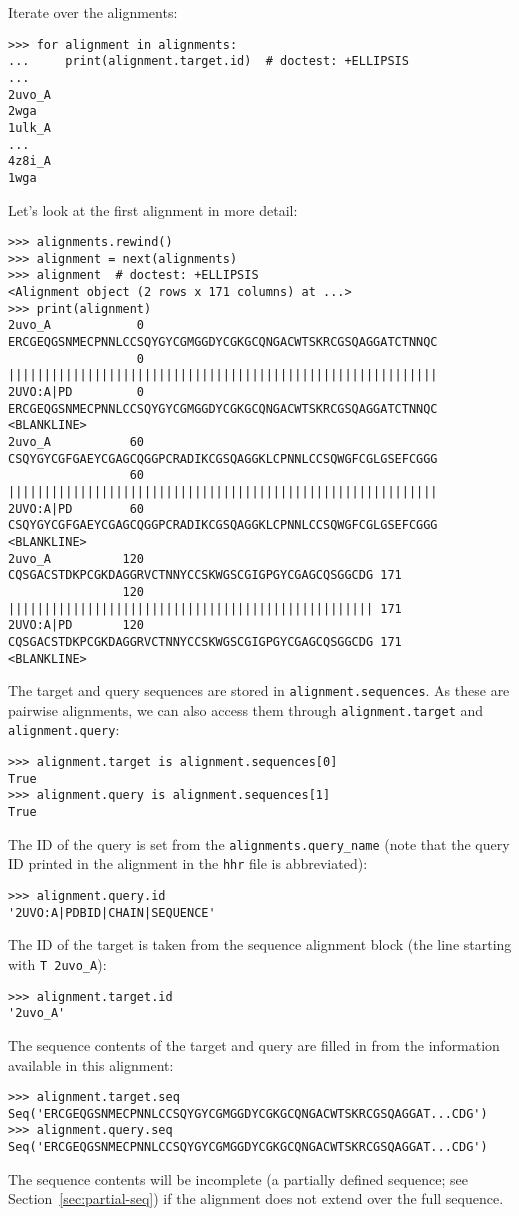 Iterate over the alignments:
\begin{verbatim}
>>> for alignment in alignments:
...     print(alignment.target.id)  # doctest: +ELLIPSIS
...
2uvo_A
2wga
1ulk_A
...
4z8i_A
1wga
\end{verbatim}
Let's look at the first alignment in more detail:
\begin{verbatim}
>>> alignments.rewind()
>>> alignment = next(alignments)
>>> alignment  # doctest: +ELLIPSIS
<Alignment object (2 rows x 171 columns) at ...>
>>> print(alignment)
2uvo_A            0 ERCGEQGSNMECPNNLCCSQYGYCGMGGDYCGKGCQNGACWTSKRCGSQAGGATCTNNQC
                  0 ||||||||||||||||||||||||||||||||||||||||||||||||||||||||||||
2UVO:A|PD         0 ERCGEQGSNMECPNNLCCSQYGYCGMGGDYCGKGCQNGACWTSKRCGSQAGGATCTNNQC
<BLANKLINE>
2uvo_A           60 CSQYGYCGFGAEYCGAGCQGGPCRADIKCGSQAGGKLCPNNLCCSQWGFCGLGSEFCGGG
                 60 ||||||||||||||||||||||||||||||||||||||||||||||||||||||||||||
2UVO:A|PD        60 CSQYGYCGFGAEYCGAGCQGGPCRADIKCGSQAGGKLCPNNLCCSQWGFCGLGSEFCGGG
<BLANKLINE>
2uvo_A          120 CQSGACSTDKPCGKDAGGRVCTNNYCCSKWGSCGIGPGYCGAGCQSGGCDG 171
                120 ||||||||||||||||||||||||||||||||||||||||||||||||||| 171
2UVO:A|PD       120 CQSGACSTDKPCGKDAGGRVCTNNYCCSKWGSCGIGPGYCGAGCQSGGCDG 171
<BLANKLINE>
\end{verbatim}
The target and query sequences are stored in \verb|alignment.sequences|. As these are pairwise alignments, we can also access them through \verb|alignment.target| and \verb|alignment.query|:
\begin{verbatim}
>>> alignment.target is alignment.sequences[0]
True
>>> alignment.query is alignment.sequences[1]
True
\end{verbatim}
The ID of the query is set from the \verb|alignments.query_name| (note that the query ID printed in the alignment in the \verb|hhr| file is abbreviated):
\begin{verbatim}
>>> alignment.query.id
'2UVO:A|PDBID|CHAIN|SEQUENCE'
\end{verbatim}
The ID of the target is taken from the sequence alignment block (the line starting with \verb|T 2uvo_A|):
\begin{verbatim}
>>> alignment.target.id
'2uvo_A'
\end{verbatim}
The sequence contents of the target and query are filled in from the information available in this alignment:
\begin{verbatim}
>>> alignment.target.seq
Seq('ERCGEQGSNMECPNNLCCSQYGYCGMGGDYCGKGCQNGACWTSKRCGSQAGGAT...CDG')
>>> alignment.query.seq
Seq('ERCGEQGSNMECPNNLCCSQYGYCGMGGDYCGKGCQNGACWTSKRCGSQAGGAT...CDG')
\end{verbatim}
The sequence contents will be incomplete (a partially defined sequence; see Section~\ref{sec:partial-seq}) if the alignment does not extend over the full sequence.

